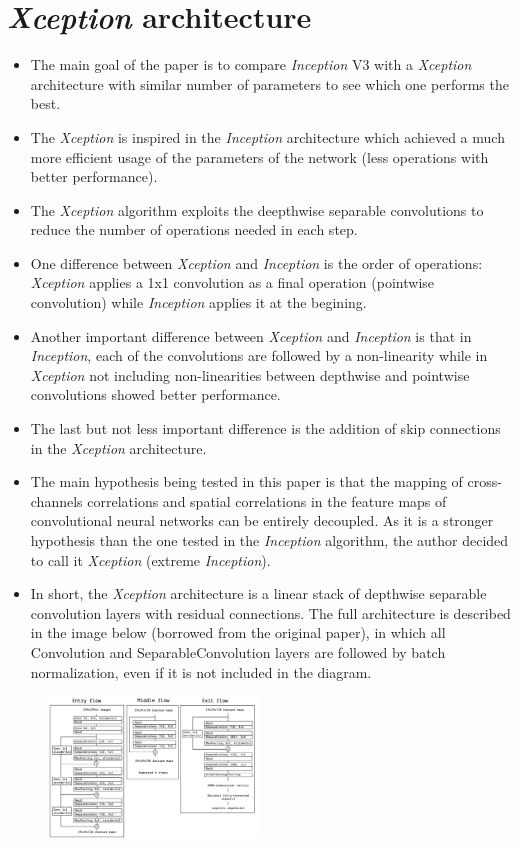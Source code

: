 \documentclass[10pt,a4paper]{article}
\begin{document}
\section*{\textit{Xception} architecture}
\begin{itemize}
\item The main goal of the paper is to compare \textit{Inception} V3 with a \textit{Xception} architecture with similar number of parameters to see which one performs the best.
\item The \textit{Xception} is inspired in the \textit{Inception} architecture which achieved a much more efficient usage of the parameters of the network (less operations with better performance).
\item The \textit{Xception} algorithm exploits the deepthwise separable convolutions to reduce the number of operations needed in each step.
\item One difference between \textit{Xception} and \textit{Inception} is the order of operations: \textit{Xception} applies a 1x1 convolution as a final operation (pointwise convolution) while \textit{Inception} applies it at the begining. 
\item Another important difference between \textit{Xception} and \textit{Inception} is that in \textit{Inception}, each of the convolutions are followed by a non-linearity while in \textit{Xception} not including non-linearities between depthwise and pointwise convolutions showed better performance.
\item The last but not less important difference is the addition of skip connections in the \textit{Xception} architecture.
\item The main hypothesis being tested in this paper is that the mapping of cross-channels correlations and spatial correlations in the feature maps of convolutional neural networks can be entirely decoupled. As it is a stronger hypothesis than the one tested in the \textit{Inception} algorithm, the author decided to call it \textit{Xception} (extreme \textit{Inception}).
\item In short, the \textit{Xception} architecture is a linear stack of depthwise separable convolution layers with residual connections. The full architecture is described in the image below (borrowed from the original paper), in which all Convolution and SeparableConvolution layers are followed by batch normalization, even if it is not included in the diagram.
\end{itemize}

\begin{figure}[h!]
	\centering
	\includegraphics[width=0.5\textwidth]{img/Xception_architecture.png}
\end{figure}
\end{document}

